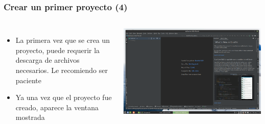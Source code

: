 \begin{frame}
\frametitle{Crear un primer proyecto (4)}  
\begin{columns}
\begin{itemize}
\item La primera vez que se crea un proyecto, puede requerir la descarga de archivos necesarios. Le recomiendo ser paciente
\item Ya una vez que el proyecto fue creado, aparece la ventana mostrada
\end{itemize}
\begin{center}
\includegraphics[width=0.95\linewidth]{00_PasosParaConfigurarSmartphoneModoDesarrollador/AndroidStudio04.png}    
\end{center}
\end{columns}
\end{frame}
